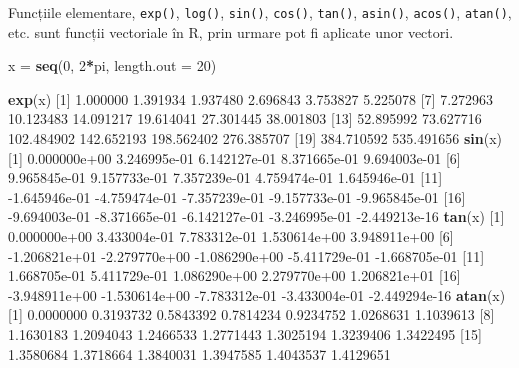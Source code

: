\documentclass[]{article}
\newenvironment{Shaded}{\begin{snugshade}}{\end{snugshade}}
\newcommand{\DataTypeTok}[1]{\textcolor[rgb]{0.13,0.29,0.53}{#1}}
\newcommand{\DecValTok}[1]{\textcolor[rgb]{0.00,0.00,0.81}{#1}}
\newcommand{\FloatTok}[1]{\textcolor[rgb]{0.00,0.00,0.81}{#1}}
\newcommand{\KeywordTok}[1]{\textcolor[rgb]{0.13,0.29,0.53}{\textbf{#1}}}
\newcommand{\NormalTok}[1]{#1}
\newcommand{\OperatorTok}[1]{\textcolor[rgb]{0.81,0.36,0.00}{\textbf{#1}}}
\newcommand{\StringTok}[1]{\textcolor[rgb]{0.31,0.60,0.02}{#1}}
\begin{document}
Funcțiile elementare, \texttt{exp()}, \texttt{log()}, \texttt{sin()},
\texttt{cos()}, \texttt{tan()}, \texttt{asin()}, \texttt{acos()},
\texttt{atan()}, etc. sunt funcții vectoriale în R, prin urmare pot fi
aplicate unor vectori.

\begin{Shaded}
\begin{Highlighting}[]
\NormalTok{x =}\StringTok{ }\KeywordTok{seq}\NormalTok{(}\DecValTok{0}\NormalTok{, }\DecValTok{2}\OperatorTok{*}\NormalTok{pi, }\DataTypeTok{length.out =} \DecValTok{20}\NormalTok{)}

\KeywordTok{exp}\NormalTok{(x)}
\NormalTok{ [}\DecValTok{1}\NormalTok{]   }\FloatTok{1.000000}   \FloatTok{1.391934}   \FloatTok{1.937480}   \FloatTok{2.696843}   \FloatTok{3.753827}   \FloatTok{5.225078}
\NormalTok{ [}\DecValTok{7}\NormalTok{]   }\FloatTok{7.272963}  \FloatTok{10.123483}  \FloatTok{14.091217}  \FloatTok{19.614041}  \FloatTok{27.301445}  \FloatTok{38.001803}
\NormalTok{[}\DecValTok{13}\NormalTok{]  }\FloatTok{52.895992}  \FloatTok{73.627716} \FloatTok{102.484902} \FloatTok{142.652193} \FloatTok{198.562402} \FloatTok{276.385707}
\NormalTok{[}\DecValTok{19}\NormalTok{] }\FloatTok{384.710592} \FloatTok{535.491656}
\KeywordTok{sin}\NormalTok{(x)}
\NormalTok{ [}\DecValTok{1}\NormalTok{]  }\FloatTok{0.000000e+00}  \FloatTok{3.246995e-01}  \FloatTok{6.142127e-01}  \FloatTok{8.371665e-01}  \FloatTok{9.694003e-01}
\NormalTok{ [}\DecValTok{6}\NormalTok{]  }\FloatTok{9.965845e-01}  \FloatTok{9.157733e-01}  \FloatTok{7.357239e-01}  \FloatTok{4.759474e-01}  \FloatTok{1.645946e-01}
\NormalTok{[}\DecValTok{11}\NormalTok{] }\FloatTok{-1.645946e-01} \FloatTok{-4.759474e-01} \FloatTok{-7.357239e-01} \FloatTok{-9.157733e-01} \FloatTok{-9.965845e-01}
\NormalTok{[}\DecValTok{16}\NormalTok{] }\FloatTok{-9.694003e-01} \FloatTok{-8.371665e-01} \FloatTok{-6.142127e-01} \FloatTok{-3.246995e-01} \FloatTok{-2.449213e-16}
\KeywordTok{tan}\NormalTok{(x)}
\NormalTok{ [}\DecValTok{1}\NormalTok{]  }\FloatTok{0.000000e+00}  \FloatTok{3.433004e-01}  \FloatTok{7.783312e-01}  \FloatTok{1.530614e+00}  \FloatTok{3.948911e+00}
\NormalTok{ [}\DecValTok{6}\NormalTok{] }\FloatTok{-1.206821e+01} \FloatTok{-2.279770e+00} \FloatTok{-1.086290e+00} \FloatTok{-5.411729e-01} \FloatTok{-1.668705e-01}
\NormalTok{[}\DecValTok{11}\NormalTok{]  }\FloatTok{1.668705e-01}  \FloatTok{5.411729e-01}  \FloatTok{1.086290e+00}  \FloatTok{2.279770e+00}  \FloatTok{1.206821e+01}
\NormalTok{[}\DecValTok{16}\NormalTok{] }\FloatTok{-3.948911e+00} \FloatTok{-1.530614e+00} \FloatTok{-7.783312e-01} \FloatTok{-3.433004e-01} \FloatTok{-2.449294e-16}
\KeywordTok{atan}\NormalTok{(x)}
\NormalTok{ [}\DecValTok{1}\NormalTok{] }\FloatTok{0.0000000} \FloatTok{0.3193732} \FloatTok{0.5843392} \FloatTok{0.7814234} \FloatTok{0.9234752} \FloatTok{1.0268631} \FloatTok{1.1039613}
\NormalTok{ [}\DecValTok{8}\NormalTok{] }\FloatTok{1.1630183} \FloatTok{1.2094043} \FloatTok{1.2466533} \FloatTok{1.2771443} \FloatTok{1.3025194} \FloatTok{1.3239406} \FloatTok{1.3422495}
\NormalTok{[}\DecValTok{15}\NormalTok{] }\FloatTok{1.3580684} \FloatTok{1.3718664} \FloatTok{1.3840031} \FloatTok{1.3947585} \FloatTok{1.4043537} \FloatTok{1.4129651}
\end{Highlighting}
\end{Shaded}
\end{document}
